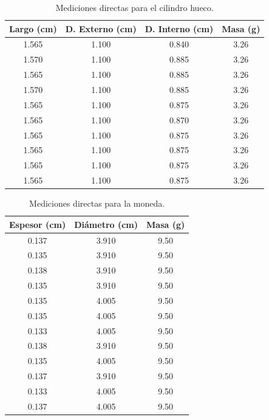 \begin{table}[h!]
    \centering
    \caption{Mediciones directas para el cilindro hueco.}
    \label{tab:cilindro_hueco}
    \begin{tabular}{cccc}
    \toprule
    \textbf{Largo (cm)} & \textbf{D. Externo (cm)} & \textbf{D. Interno (cm)} & \textbf{Masa (g)} \\
    \midrule
    1.565 & 1.100 & 0.840 & 3.26 \\
    1.570 & 1.100 & 0.885 & 3.26 \\
    1.565 & 1.100 & 0.885 & 3.26 \\
    1.570 & 1.100 & 0.885 & 3.26 \\
    1.565 & 1.100 & 0.875 & 3.26 \\
    1.565 & 1.100 & 0.870 & 3.26 \\
    1.565 & 1.100 & 0.875 & 3.26 \\
    1.565 & 1.100 & 0.875 & 3.26 \\
    1.565 & 1.100 & 0.875 & 3.26 \\
    1.565 & 1.100 & 0.875 & 3.26 \\
    \bottomrule
    \end{tabular}
\end{table}

\begin{table}[h!]
    \centering
    \caption{Mediciones directas para la moneda.}
    \label{tab:moneda}
    \begin{tabular}{ccc}
    \toprule
    \textbf{Espesor (cm)} & \textbf{Diámetro (cm)} & \textbf{Masa (g)} \\
    \midrule
    0.137 & 3.910 & 9.50 \\
    0.135 & 3.910 & 9.50 \\
    0.138 & 3.910 & 9.50 \\
    0.135 & 3.910 & 9.50 \\
    0.135 & 4.005 & 9.50 \\
    0.135 & 4.005 & 9.50 \\
    0.133 & 4.005 & 9.50 \\
    0.138 & 3.910 & 9.50 \\
    0.135 & 4.005 & 9.50 \\
    0.137 & 3.910 & 9.50 \\
    0.133 & 4.005 & 9.50 \\
    0.137 & 4.005 & 9.50 \\
    \bottomrule
    \end{tabular}
\end{table}

